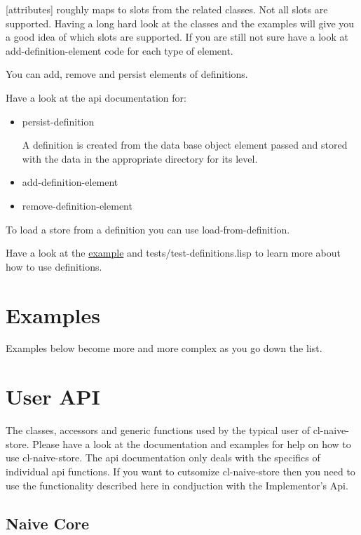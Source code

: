 \documentclass[11pt]{article}
\begin{document}
[attributes] roughly maps to slots from the related classes. Not all
slots are supported. Having a long hard look at the classes and the
examples will give you a good idea of which slots are supported. If
you are still not sure have a look at add-definition-element code for
each type of element.

You can add, remove and persist elements of definitions.

Have a look at the api documentation for:

\begin{itemize}
\item persist-definition

A definition is created from the data base object element passed and
stored with the data in the appropriate directory for its level.

\item add-definition-element
\item remove-definition-element
\end{itemize}

To load a store from a definition you can use load-from-definition.

Have a look at the \href{definitions-example.org}{example} and tests/test-definitions.lisp to learn
more about how to use definitions.

\section{Examples}
\label{sec:org182a1f8}

Examples below become more and more complex as you go down the list.

\section{User API}
\label{sec:org00ee4ee}

The classes, accessors and generic functions used by the typical user
of cl-naive-store. Please have a look at the documentation and
examples for help on how to use cl-naive-store. The api documentation
only deals with the specifics of individual api functions. If you want
to cutsomize cl-naive-store then you need to use the functionality
described here in condjuction with the Implementor's Api.

\subsection{Naive Core}
\label{sec:org2868ff4}
\end{document}
